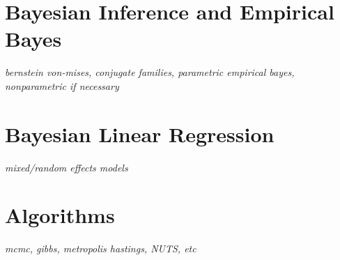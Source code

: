 \documentclass[../../../main.tex]{subfiles}
\begin{document}

\section{Bayesian Inference and Empirical Bayes}
\textit{bernstein von-mises, conjugate families, parametric empirical bayes, nonparametric if necessary}

\section{Bayesian Linear Regression}
\textit{mixed/random effects models}

\section{Algorithms}
\textit{mcmc, gibbs, metropolis hastings, NUTS, etc}

\printbibliography[
    heading=subbibintoc,
    title={References}
]
\end{document}
